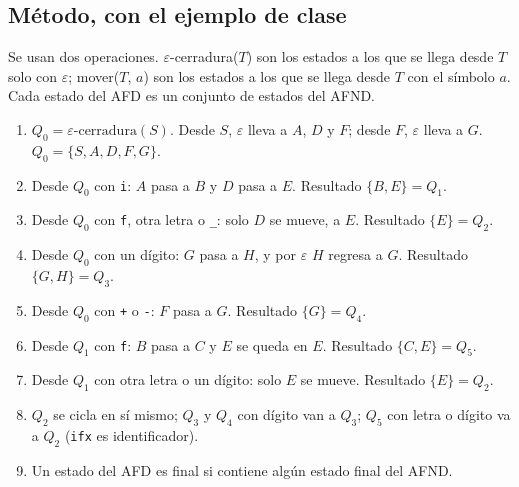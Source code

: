 \documentclass[12pt,letterpaper]{article}
\newcommand{\cd}[1]{\texttt{#1}}                       %
\begin{document}
\subsection{Método, con el ejemplo de clase}

Se usan dos operaciones. $\varepsilon$-cerradura($T$) son los estados a los que se llega desde $T$ solo con $\varepsilon$; mover($T$, $a$) son los estados a los que se llega desde $T$ con el símbolo $a$. Cada estado del AFD es un conjunto de estados del AFND.

\begin{enumerate}
    \item $Q_0 = \varepsilon\text{-cerradura}(S)$. Desde $S$, $\varepsilon$ lleva a $A$, $D$ y $F$; desde $F$, $\varepsilon$ lleva a $G$. $Q_0 = \{S, A, D, F, G\}$.
    \item Desde $Q_0$ con \cd{i}: $A$ pasa a $B$ y $D$ pasa a $E$. Resultado $\{B, E\} = Q_1$.
    \item Desde $Q_0$ con \cd{f}, otra letra o \cd{\_}: solo $D$ se mueve, a $E$. Resultado $\{E\} = Q_2$.
    \item Desde $Q_0$ con un dígito: $G$ pasa a $H$, y por $\varepsilon$ $H$ regresa a $G$. Resultado $\{G, H\} = Q_3$.
    \item Desde $Q_0$ con \cd{+} o \cd{-}: $F$ pasa a $G$. Resultado $\{G\} = Q_4$.
    \item Desde $Q_1$ con \cd{f}: $B$ pasa a $C$ y $E$ se queda en $E$. Resultado $\{C, E\} = Q_5$.
    \item Desde $Q_1$ con otra letra o un dígito: solo $E$ se mueve. Resultado $\{E\} = Q_2$.
    \item $Q_2$ se cicla en sí mismo; $Q_3$ y $Q_4$ con dígito van a $Q_3$; $Q_5$ con letra o dígito va a $Q_2$ (\cd{ifx} es identificador).
    \item Un estado del AFD es final si contiene algún estado final del AFND.
\end{enumerate}
\end{document}
